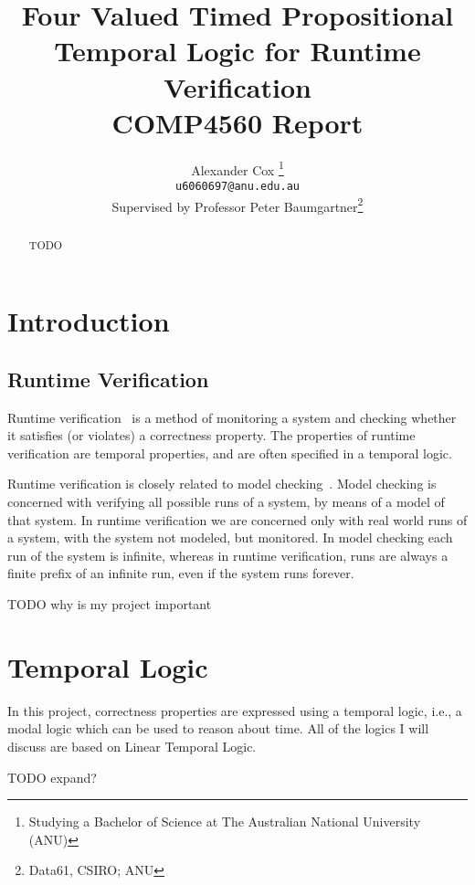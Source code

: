 \documentclass[a4paper]{article}
\title{
  Four Valued Timed Propositional Temporal Logic for Runtime Verification\\
  \normalsize{} COMP4560 Report
}
\author{
  Alexander Cox
  \thanks{Studying a Bachelor of Science at The Australian National University (ANU)}\\
  \small\texttt{u6060697@anu.edu.au}\\
  \normalsize{}Supervised by Professor Peter Baumgartner\thanks{Data61, CSIRO\@; ANU}
}
\begin{document}
\lstset{language=Scala,basicstyle=\ttfamily\small,showstringspaces=false,frame=tl,framerule=1pt,float=tbh,captionpos=b}
\maketitle

\begin{abstract} %
  TODO
\end{abstract}
\newpage
\tableofcontents

\section{Introduction}
\subsection{Runtime Verification}
Runtime verification~\autocite{colin2005rv} is a method of monitoring a system and checking whether it satisfies (or violates) a correctness property.
The properties of runtime verification are temporal properties, and are often specified in a temporal logic. %

Runtime verification is closely related to model checking~\autocite{baier2008principles}. Model checking is concerned with verifying all possible runs of a system, by means of a model of that system. In runtime verification we are concerned only with real world runs of a system, with the system not modeled, but monitored. In model checking each run of the system is infinite, whereas in runtime verification, runs are always a finite prefix of an infinite run, even if the system runs forever.

TODO why is my project important

\section{Temporal Logic}
In this project, correctness properties are expressed using a temporal logic, i.e., a modal logic which can be used to reason about time. All of the logics I will discuss are based on Linear Temporal Logic.

TODO expand?
\end{document}
